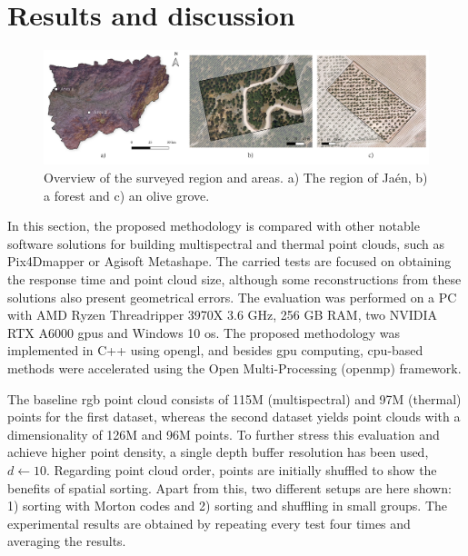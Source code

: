 \section{Results and discussion}

\begin{figure}
    \centering
    \includegraphics[width=.97\linewidth]{figs/multi_thermal_projection/study area.png}
    \caption{Overview of the surveyed region and areas. a) The region of Jaén, b) a forest and c) an olive grove. }
\label{fig:occlusion_study_area}
\end{figure}

In this section, the proposed methodology is compared with other notable software solutions for building multispectral and thermal point clouds, such as Pix4Dmapper or Agisoft Metashape. The carried tests are focused on obtaining the response time and point cloud size, although some reconstructions from these solutions also present geometrical errors. The evaluation was performed on a PC with AMD Ryzen Threadripper 3970X 3.6 GHz, 256 GB RAM, two NVIDIA RTX A6000 \acrshort{gpu}s and Windows 10 \acrshort{os}. The proposed methodology was implemented in C++ using \acrshort{opengl}, and besides \acrshort{gpu} computing, \acrshort{cpu}-based methods were accelerated using the Open Multi-Processing (\acrshort{openmp}) framework.

The baseline \acrshort{rgb} point cloud consists of 115M (multispectral) and 97M (thermal) points for the first dataset, whereas the second dataset yields point clouds with a dimensionality of 126M and 96M points. To further stress this evaluation and achieve higher point density, a single depth buffer resolution has been used, $d\gets 10$. Regarding point cloud order, points are initially shuffled to show the benefits of spatial sorting. Apart from this, two different setups are here shown: 1) sorting with Morton codes and 2) sorting and shuffling in small groups. The experimental results are obtained by repeating every test four times and averaging the results. 

